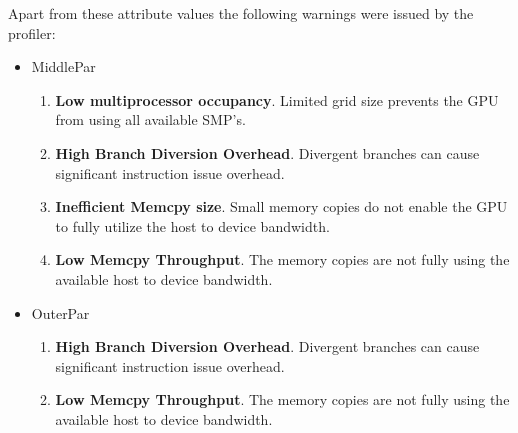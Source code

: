 Apart from these attribute values the following warnings were issued by the profiler:
\begin{itemize}
	\item MiddlePar
	\begin{enumerate}
		\item \textbf{Low multiprocessor occupancy}. Limited grid size prevents the GPU from using all available SMP's.
		\item \textbf{High Branch Diversion Overhead}. Divergent branches can cause significant instruction issue overhead.
		\item \textbf{Inefficient Memcpy size}. Small memory copies do not enable the GPU to fully utilize the host to device bandwidth.
		\item \textbf{Low Memcpy Throughput}. The memory copies are not fully using the available host to device bandwidth.
	\end{enumerate}
	\item OuterPar
	\begin{enumerate}
		\item \textbf{High Branch Diversion Overhead}. Divergent branches can cause significant instruction issue overhead.
		\item \textbf{Low Memcpy Throughput}. The memory copies are not fully using the available host to device bandwidth.
	\end{enumerate}
\end{itemize}


